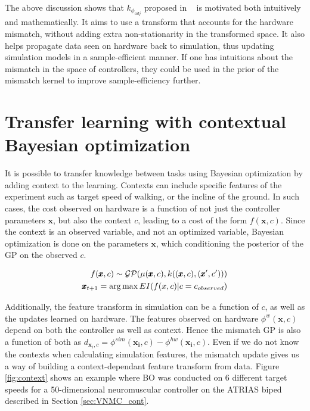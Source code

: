 The above discussion shows that $k_{\phi_{adj}}$ proposed in ~\cite{rai2017bayesian} is motivated both intuitively and mathematically. It aims to use a transform that accounts for the hardware mismatch, without adding extra non-stationarity in the transformed space. It also helps propagate data seen on hardware back to simulation, thus updating simulation models in a sample-efficient manner. If one has intuitions about the mismatch in the space of controllers, they could be used in the prior of the mismatch kernel to improve sample-efficiency further. 

\section{Transfer learning with contextual Bayesian optimization}


It is possible to transfer knowledge between tasks using Bayesian optimization by adding context to the learning. Contexts can include specific features of the experiment such as target speed of walking, or the incline of the ground. In such cases, the cost observed on hardware is a function of not just the controller parameters $\pmb{x}$, but also the context $c$, leading to a cost of the form $f(\pmb{x},c)$. Since the context is an observed variable, and not an optimized variable, Bayesian optimization is done on the parameters $\pmb{x}$, which conditioning the posterior of the GP on the observed $c$.

\begin{align}
    f(\pmb{x},c) \sim \mathcal{GP}(\mu(\pmb{x}, c), k((\pmb{x},c),(\pmb{x}',c'))) \\
    \pmb{x}_{t+1} = \operatorname*{arg\,max} EI(f(x,c)|c=c_{observed})
\end{align}

Additionally, the feature transform in simulation can be a function of $c$, as well as the updates learned on hardware. The features observed on hardware $\phi^{w}(\pmb{x}, c)$ depend on both the controller as well as context. Hence the mismatch GP is also a function of both as $d_{\pmb{x}_i, c} = \phi^{sim}(\pmb{x_i},c)- \phi^{hw}(\pmb{x_i},c)$. Even if we do not know the contexts when calculating simulation features, the mismatch update gives us a way of building a context-dependant feature transform from data. Figure \ref{fig:context} shows an example where BO was conducted on 6 different target speeds for a 50-dimensional neuromuscular controller on the ATRIAS biped described in Section \ref{sec:VNMC_cont}.  


